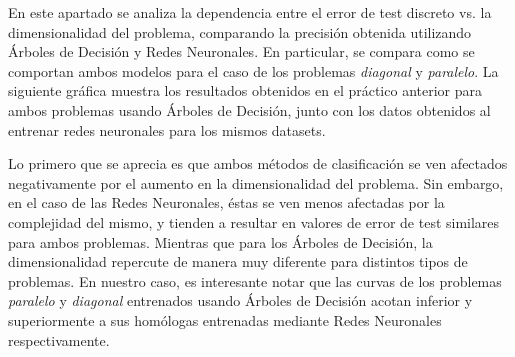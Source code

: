 \documentclass[a4paper, 11pt]{article} %
\begin{document}
En este apartado se analiza la dependencia entre el error de test discreto vs.
la dimensionalidad del problema, comparando la precisión obtenida utilizando
Árboles de Decisión y Redes Neuronales. En particular, se compara como se
comportan ambos modelos para el caso de los problemas \textit{diagonal} y
\textit{paralelo}. La siguiente gráfica muestra los resultados obtenidos en el
práctico anterior para ambos problemas usando Árboles de Decisión, junto con
los datos obtenidos al entrenar redes neuronales para los mismos datasets.


\begin{figure}[H]
\captionsetup[subfigure]{justification=centering, labelformat=empty}
  \centering
\end{figure}

Lo primero que se aprecia es que ambos métodos de clasificación se ven
afectados negativamente por el aumento en la dimensionalidad del problema. Sin
embargo, en el caso de las Redes Neuronales, éstas se ven menos afectadas por
la complejidad del mismo, y tienden a resultar en valores de error de test
similares para ambos problemas. Mientras que para los Árboles de Decisión, la
dimensionalidad repercute de manera muy diferente para distintos tipos de
problemas. En nuestro caso, es interesante notar que las curvas de los
problemas \textit{paralelo} y \textit{diagonal} entrenados usando Árboles de
Decisión acotan inferior y superiormente a sus homólogas entrenadas mediante
Redes Neuronales respectivamente.
\end{document}

